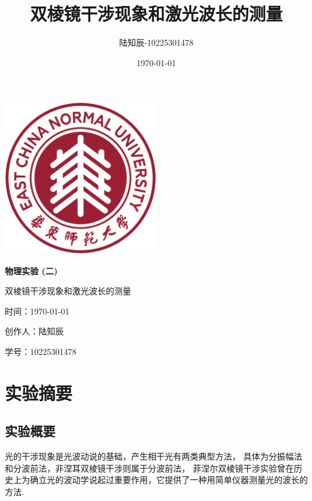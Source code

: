 \documentclass{ctexart}
\title{双棱镜干涉现象和激光波长的测量}
\author{陆知辰-10225301478}
\date{\today}
\begin{document}
\begin{titlepage}
  \centering
  \includegraphics[width=0.5\textwidth]{ecnu.png}
  
  \vspace*{\baselineskip}
  
  \Huge\textbf{物\quad 理\quad 实\quad 验 \quad (二)}
  \vspace*{0.3\baselineskip}
  
  \huge 双棱镜干涉现象和激光波长的测量
  
  \vspace*{2\baselineskip}
  
  \large 时间：\today
  
  \vspace*{\baselineskip}
  
  \large 创作人：陆知辰
  
  \vspace*{\baselineskip}
  
  \large 学号：10225301478
  
\end{titlepage}
\newpage
\tableofcontents
\newpage
\section{实验摘要}
  \subsection{实验概要}
  光的干涉现象是光波动说的基础，产生相干光有两类典型方法，
  具体为分振幅法和分波前法，非涅耳双棱镜干涉则属于分波前法，
  菲涅尔双棱镜干涉实验曾在历史上为确立光的波动学说起过重要作用，它提供了一种用简单仪器测量光的波长的方法.
\end{document}
